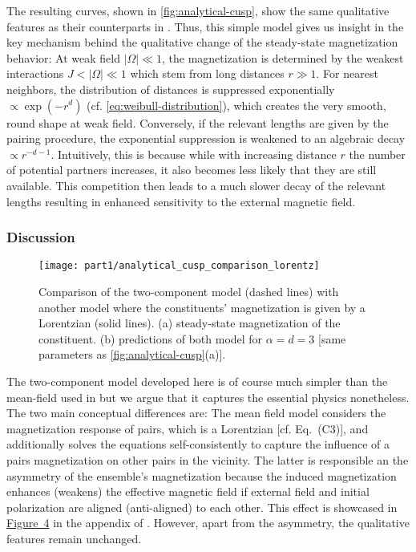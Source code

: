 The resulting curves, shown in \autoref{fig:analytical-cusp}, show the same qualitative features as their counterparts in \cite{franzEmergentPairLocalization2024}. Thus, this simple model gives us insight in the key mechanism behind the qualitative change of the steady-state magnetization behavior: At weak field $|\Omega|\ll 1$, the magnetization is determined by the weakest interactions $J<|\Omega|\ll 1$ which stem from long distances $r \gg 1$. For nearest neighbors, the distribution of distances is suppressed exponentially $\propto \exp(-r^d)$ (cf. \autoref{eq:weibull-distribution}), which creates the very smooth, round shape at weak field. Conversely, if the relevant lengths are given by the pairing procedure, the exponential suppression is weakened to an algebraic decay $\propto r^{-d-1}$. Intuitively, this is because while with increasing distance $r$ the number of potential partners increases, it also becomes less likely that they are still available. This competition then leads to a much slower decay of the relevant lengths resulting in enhanced sensitivity to the external magnetic field.

\subsubsection{Discussion}

\begin{figure}[htb]
	\centering
	\texttt{[image: part1/analytical\_cusp\_comparison\_lorentz]}
	\caption{Comparison of the two-component model (dashed lines) with another model where the constituents' magnetization is given by a Lorentzian (solid lines). (a) steady-state magnetization of the constituent. (b) predictions of both model for $\alpha=d=3$ [same parameters as \autoref{fig:analytical-cusp}(a)].
	}
	\label{fig:analytical-cusp-comparison-lorentz}
\end{figure}

The two-component model developed here is of course much simpler than the mean-field used in \cite{franzEmergentPairLocalization2024} but we argue that it captures the essential physics nonetheless. The two main conceptual differences are: The mean field model considers the magnetization response of pairs, which is a Lorentzian [cf. Eq.~(C3)], and additionally solves the equations self-consistently to capture the influence of a pairs magnetization on other pairs in the vicinity. The latter is responsible an the asymmetry of the ensemble's magnetization because the induced magnetization enhances (weakens) the effective magnetic field if external field and initial polarization are aligned (anti-aligned) to each other. This effect is showcased in \hyperlink{pub-Franz2022-Cusp.pdf.10}{Figure~4} in the appendix of \cite{franzEmergentPairLocalization2024}. However, apart from the asymmetry, the qualitative features remain unchanged.

